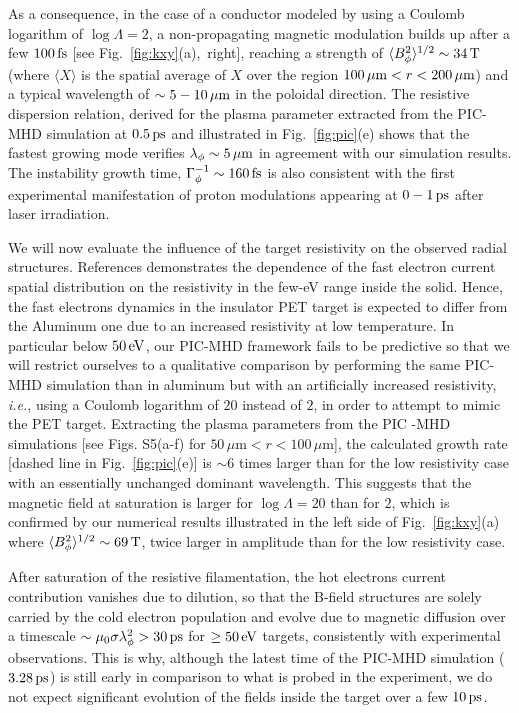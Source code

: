\documentclass[aps,twocolumn,showpacs,superscriptaddress]{revtex4}
\begin{document}
%
As a consequence, in the case of a conductor modeled by using a Coulomb logarithm of $\log \Lambda = 2$,  a non-propagating magnetic modulation builds up after a few $100\,\rm fs$ [see \mbox{Fig.~\ref{fig:kxy}(a), right}], reaching a strength of  $\langle B_\phi^2\rangle^{1/2}\sim 34\,\rm T$ (where $\langle X \rangle$ is the spatial average of $X$ over the region  $100\,\mu\mathrm{m}<r<200\,\mu \rm m$) and a typical wavelength of $\sim 5-10\,\rm \mu m$  in the poloidal direction. The resistive dispersion relation, derived for the plasma parameter extracted from the PIC-MHD simulation at $0.5\,\rm ps$ and illustrated in Fig.~\ref{fig:pic}(e)  shows that the fastest growing mode verifies $\lambda_\phi \sim 5\,\mu \rm m$  in agreement with our simulation results. The instability  growth time, $\Gamma_\phi^{-1} \sim 160\,\rm fs$  is also  consistent with the first experimental manifestation of proton modulations appearing at $0-1\,\rm ps$ after laser irradiation.

We will now evaluate the influence of the target resistivity on the observed radial structures.
References \cite{PRL_McKenna_2011, PRL_MacLellan_2013} demonstrates the dependence of the fast electron current spatial distribution  on the resistivity in the few-eV range inside the solid. Hence, the fast electrons dynamics in the insulator PET target is expected to differ from the Aluminum one due to an increased resistivity at low temperature. In particular below $50\,\rm eV$, our PIC-MHD framework fails to be predictive so that we will restrict ourselves to a qualitative comparison by performing the same PIC-MHD simulation than in aluminum but with an artificially  increased resistivity, \emph{i.e.}, using  a Coulomb logarithm of $20$ instead of $2$, in order to attempt to mimic the PET target.
Extracting the plasma parameters from the PIC -MHD simulations [see Figs. S5(a-f) for $50\, \mu$m$<r<100\, \mu$m], 
the calculated growth rate [dashed line in Fig.~\ref{fig:pic}(e)] is $\sim 6$ times larger than for the  low resistivity case with  an  essentially unchanged dominant wavelength. This suggests \cite{POF_Davidson_1972} that the magnetic field at saturation is larger for $\log\Lambda = 20$ than for $2$, which is confirmed by our numerical results illustrated in  the left side of Fig.~\ref{fig:kxy}(a) where  $\langle B_\phi^2 \rangle^{1/2} \sim 69\,\rm T$, twice larger  in amplitude than for the low resistivity case. 

After saturation of  the resistive filamentation, the hot electrons current contribution vanishes due to dilution, so that the B-field structures are solely carried by the cold electron population and evolve due to magnetic diffusion  over a  timescale $\sim \mu_0 \sigma \lambda_\phi^2 > 30\,\rm ps$ for $ \ge 50\,\rm eV$ targets, consistently with experimental observations. This is why, although the latest time of the PIC-MHD simulation ($3.28\,\rm ps$) is still early in comparison to what is probed in the experiment,  we do not expect significant evolution of the fields inside the target over a few $10\,\rm ps$.
\end{document}
